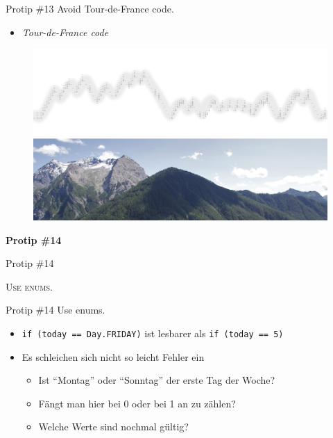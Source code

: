 \documentclass[18pt]{beamer}
\newcommand{\quotes}[1]{``#1''}
\begin{document}
\begin{frame}{Protip \#13 Avoid Tour-de-France code.}
    \begin{itemize}
        \item \textit{Tour-de-France code}
    \end{itemize}

    \begin{figure}
        \includegraphics[scale=.4]{img/tourdefrancecode2.png}
    \end{figure}
\end{frame}

\begin{frame}{\quad}
    \center
    \Huge{\textbf{Protip \#14}}
\end{frame}

\begin{frame}{Protip \#14}
    \begin{block}{}
        \center
        \textsc{Use enums.}
    \end{block}
\end{frame}

\begin{frame}{Protip \#14 Use enums.}
    \begin{itemize}
        \item \texttt{if (today == Day.FRIDAY)} ist lesbarer als \texttt{if (today == 5)}
        \item Es schleichen sich nicht so leicht Fehler ein
        \begin{itemize}
            \item Ist \quotes{Montag} oder \quotes{Sonntag} der erste Tag der Woche?
            \item Fängt man hier bei 0 oder bei 1 an zu zählen?
            \item Welche Werte sind nochmal gültig?
        \end{itemize}
    \end{itemize}
\end{frame}
\end{document}
